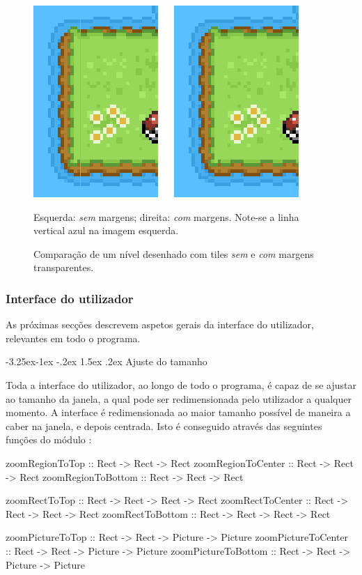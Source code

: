 \documentclass[a4paper]{article}
\makeatletter
\renewcommand\paragraph{\@startsection{paragraph}{4}{\z@}%
	{-3.25ex\@plus -1ex \@minus -.2ex}%
	{1.5ex \@plus .2ex}%
	{\normalfont\normalsize\bfseries}}
\makeatother
\begin{document}
\begin{figure}[ht]
	\centering
	\includegraphics[height=0.23\textheight]{images/tile_wrapping_comparison.png}
	\caption{Comparação de um nível desenhado com tiles \emph{sem} e \emph{com} margens transparentes.}
	\label{fig:tile_wrapping_comparison}
	\smallskip\small
	Esquerda: \emph{sem} margens; direita: \emph{com} margens. Note-se a linha vertical azul na imagem esquerda.
\end{figure}

\subsubsection{Interface do utilizador}

As próximas secções descrevem aspetos gerais da interface do utilizador, relevantes em todo o programa.

\paragraph{Ajuste do tamanho}
\label{sec:ajustedotamanho}

Toda a interface do utilizador, ao longo de todo o programa, é capaz de se ajustar ao tamanho da janela, a qual pode ser redimensionada pelo utilizador a qualquer momento. A interface é redimensionada ao maior tamanho possível de maneira a caber na janela, e depois centrada. Isto é conseguido através das seguintes funções do módulo :

\begin{haskellblock}
zoomRegionToTop     :: Rect -> Rect -> Rect
zoomRegionToCenter  :: Rect -> Rect -> Rect
zoomRegionToBottom  :: Rect -> Rect -> Rect

zoomRectToTop       :: Rect -> Rect -> Rect -> Rect
zoomRectToCenter    :: Rect -> Rect -> Rect -> Rect
zoomRectToBottom    :: Rect -> Rect -> Rect -> Rect

zoomPictureToTop    :: Rect -> Rect -> Picture -> Picture
zoomPictureToCenter :: Rect -> Rect -> Picture -> Picture
zoomPictureToBottom :: Rect -> Rect -> Picture -> Picture
\end{haskellblock}
\end{document}
